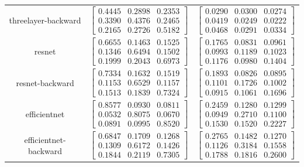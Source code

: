 \documentclass{article} %
\begin{document}
\begin{table}
\begin{tabular}{ccc}
threelayer-backward & $\begin{bmatrix}0.4445 & 0.2898 & 0.2353\\0.3390 & 0.4376 & 0.2465\\0.2165 & 0.2726 & 0.5182\end{bmatrix}$ & $\begin{bmatrix}0.0290 & 0.0300 & 0.0274\\0.0419 & 0.0249 & 0.0222\\0.0468 & 0.0291 & 0.0334\end{bmatrix}$\\
resnet & $\begin{bmatrix}0.6655 & 0.1463 & 0.1525\\0.1346 & 0.6494 & 0.1502\\0.1999 & 0.2043 & 0.6973\end{bmatrix}$ & $\begin{bmatrix}0.1765 & 0.0831 & 0.0961\\0.0993 & 0.1189 & 0.1023\\0.1176 & 0.0980 & 0.1404\end{bmatrix}$\\
resnet-backward & $\begin{bmatrix}0.7334 & 0.1632 & 0.1519\\0.1153 & 0.6529 & 0.1157\\0.1513 & 0.1839 & 0.7324\end{bmatrix}$ & $\begin{bmatrix}0.1893 & 0.0826 & 0.0895\\0.1101 & 0.1726 & 0.1002\\0.0915 & 0.1061 & 0.1696\end{bmatrix}$\\
efficientnet & $\begin{bmatrix}0.8577 & 0.0930 & 0.0811\\0.0532 & 0.8075 & 0.0670\\0.0891 & 0.0995 & 0.8520\end{bmatrix}$ & $\begin{bmatrix}0.2459 & 0.1280 & 0.1299\\0.0949 & 0.2710 & 0.1100\\0.1530 & 0.1520 & 0.2227\end{bmatrix}$\\
efficientnet-backward & $\begin{bmatrix}0.6847 & 0.1709 & 0.1268\\0.1309 & 0.6172 & 0.1426\\0.1844 & 0.2119 & 0.7305\end{bmatrix}$ & $\begin{bmatrix}0.2765 & 0.1482 & 0.1270\\0.1126 & 0.3184 & 0.1558\\0.1788 & 0.1816 & 0.2600\end{bmatrix}$\\

\end{tabular}
\end{table}
\end{document}
